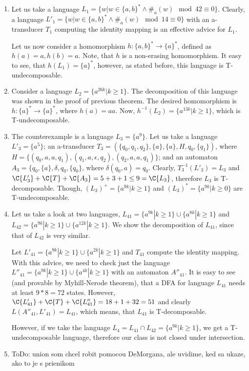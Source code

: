\paragraph{}
\dokaz
\begin{enumerate}
\item Let us take a language $L_1 = \{w|w \in \{ a,b\}^* \wedge \#_{a}(w) \mod 42 \equiv 0 \}$. Clearly, a language $L'_1 = \{w|w \in \{ a,b\}^* \wedge \#_{a}(w) \mod 14 \equiv 0 \}$ with an a-transducer $T_1$ computing the identity mapping is an effective advice for $L_1$.

Let us now consider a homomorphism $h: \{ a,b\}^* \to \{ a \}^*$, defined as $h(a) = a, h(b) = a$. Note, that $h$ is a non-erasing homomorphism. It easy to see, that $h(L_1) = \{ a \}^*$, however, as stated before, this language is T-undecomposable.

\item Consider a language $L_2 = \{ a^{26k} | k \geq 1 \}$. The decomposition of this language was shown in the proof of previous theorem. The desired homomorphism is $h: \{a\}^* \to \{a\}^*$, where $h(a) = aa$. Now, $h^{-1}(L_2) = \{ a^{13k} | k \geq 1 \}$, which is T-undecomposable.

\item
The counterexample is a language $L_3 = \{ a^{9} \}$. Let us take a language $L'_3 = \{ a^{5} \}$; an a-transducer $T_3 = (\{q_0, q_1, q_2\}, \{a\}, \{a\}, H, q_0, \{q_1\})$, where $H = \{ (q_0, a, a, q_1), (q_1, a, \epsilon, q_2), (q_2, a, a, q_1) \}$; and an automaton $A_3 = \{q_0, \{a\}, \delta, q_0, \{q_0\} $, where $\delta(q_0, a) = q_0$. Clearly, $T_3^{-1}(L'_3) = L_3$ and $\C{L'_3} + \C{T} + \C{A_3} = 5 + 3 + 1 \leq 9 = \C{L_3}$, therefore $L_3$ is T-decomposable. Though, $(L_3)^+ = \{ a^{9k} | k \geq 1 \}$ and $(L_3)^* = \{ a^{9k} | k \geq 0 \}$ are T-undecomposable.

\item Let us take a look at two languages, $L_{41} = \{ a^{9k} | k \geq 1 \} \cup \{ a^{8k} | k \geq 1 \}$ and $L_{42} = \{ a^{9k} | k \geq 1 \} \cup \{ a^{12k} | k \geq 1 \}$. We show the decomposition of $L_{41}$, since that of $L_{42}$ is very similar.

Let $L'_{41} = \{ a^{9k} | k \geq 1 \} \cup \{ a^{2k} | k \geq 1 \}$ and $T_{41}$ compute the identity mapping. With this advice, we need to check just the language $L''_{41} = \{ a^{9k} | k \geq 1 \} \cup \{ a^{4k} | k \geq 1 \}$ with an automaton $A''_{41}$. It is easy to see (and provable by Myhill-Nerode theorem), that a DFA for language $L_{41}$ needs at least $9*8 = 72$ states. However, $\C{L'_{41}} + \C{T} + \C{L''_{41}} = 18 + 1 + 32 = 51$ and clearly $L(A''_{41}, L'_{41}) = L_{41}$, which means, that $L_{41}$ is T-decomposable.

However, if we take the language $L_4 = L_{41} \cap L_{42} = \{ a^{9k} | k \geq 1 \}$, we get a T-undecomposable language, therefore our class is not closed under intersection.

\item \color{red}ToDo: union som chcel robit pomocou DeMorgana, ale uvidime, ked sa ukaze, ako to je s prienikom\color{black}
\end{enumerate}
\square

